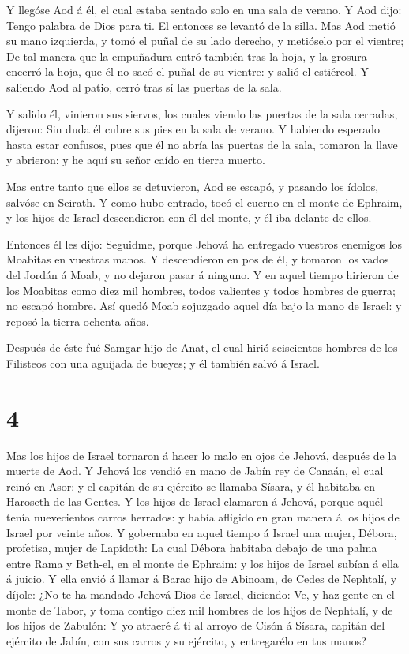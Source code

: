  Y llegóse Aod á él, el cual estaba sentado solo en una
sala de verano. Y Aod dijo: Tengo palabra de Dios para ti. El entonces
se levantó de la silla.  Mas Aod metió su mano izquierda, y
tomó el puñal de su lado derecho, y metióselo por el vientre;
 De tal manera que la empuñadura entró también tras la
hoja, y la grosura encerró la hoja, que él no sacó el puñal de su
vientre: y salió el estiércol.  Y saliendo Aod al patio,
cerró tras sí las puertas de la sala.

 Y salido él, vinieron sus siervos, los cuales viendo las
puertas de la sala cerradas, dijeron: Sin duda él cubre sus pies en la
sala de verano.  Y habiendo esperado hasta estar confusos,
pues que él no abría las puertas de la sala, tomaron la llave y
abrieron: y he aquí su señor caído en tierra muerto.

 Mas entre tanto que ellos se detuvieron, Aod se escapó, y
pasando los ídolos, salvóse en Seirath.  Y como hubo
entrado, tocó el cuerno en el monte de Ephraim, y los hijos de Israel
descendieron con él del monte, y él iba delante de ellos.

 Entonces él les dijo: Seguidme, porque Jehová ha entregado
vuestros enemigos los Moabitas en vuestras manos. Y descendieron en pos
de él, y tomaron los vados del Jordán á Moab, y no dejaron pasar á
ninguno.  Y en aquel tiempo hirieron de los Moabitas como
diez mil hombres, todos valientes y todos hombres de guerra; no escapó
hombre.  Así quedó Moab sojuzgado aquel día bajo la mano de
Israel: y reposó la tierra ochenta años.

 Después de éste fué Samgar hijo de Anat, el cual hirió
seiscientos hombres de los Filisteos con una aguijada de bueyes; y él
también salvó á Israel.

\hypertarget{section-3}{%
\section{4}\label{section-3}}

 Mas los hijos de Israel tornaron á hacer lo malo en ojos de
Jehová, después de la muerte de Aod.  Y Jehová los vendió en
mano de Jabín rey de Canaán, el cual reinó en Asor: y el capitán de su
ejército se llamaba Sísara, y él habitaba en Haroseth de las Gentes.
 Y los hijos de Israel clamaron á Jehová, porque aquél tenía
nuevecientos carros herrados: y había afligido en gran manera á los
hijos de Israel por veinte años.  Y gobernaba en aquel
tiempo á Israel una mujer, Débora, profetisa, mujer de Lapidoth:
 La cual Débora habitaba debajo de una palma entre Rama y
Beth-el, en el monte de Ephraim: y los hijos de Israel subían á ella á
juicio.  Y ella envió á llamar á Barac hijo de Abinoam, de
Cedes de Nephtalí, y díjole: ¿No te ha mandado Jehová Dios de Israel,
diciendo: Ve, y haz gente en el monte de Tabor, y toma contigo diez mil
hombres de los hijos de Nephtalí, y de los hijos de Zabulón:
 Y yo atraeré á ti al arroyo de Cisón á Sísara, capitán del
ejército de Jabín, con sus carros y su ejército, y entregarélo en tus
manos?

